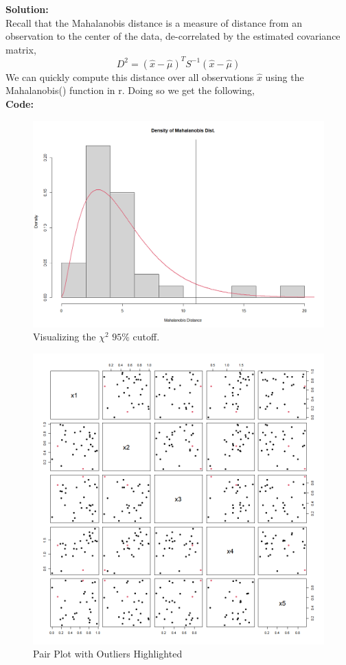 \documentclass[12pt]{article}
\makeatletter
\theoremstyle{homework}
\newenvironment{exercise}[1]
{\def\@currentlabel{#1}\exercisecore}
{\endexercisecore}
\newcommand{\localhead}[1]{\par\smallskip\noindent\textbf{#1}\nobreak\\}%
\newcommand\solution{\localhead{Solution:}}
\makeatother
\begin{document}
\begin{exercise}{1}
    \solution Recall that the Mahalanobis distance is a measure of distance from an observation to the 
    center of the data, de-correlated by the estimated covariance matrix, 
    \begin{equation*}
      D^2 = (\hat{x} - \hat{\mu})^{T}S^{-1}(\hat{x} - \hat{\mu})
    \end{equation*}
    We can quickly compute this distance over all observations $\hat{x}$ using the Mahalanobis() function in r. 
    Doing so we get the following, \\
    \textbf{Code:}
    \begin{center}
    
    \end{center}
    \begin{figure}[H]
      \begin{center}
        \caption{Visualizing the $\chi^2$ $95\%$ cutoff.}
      \includegraphics[width = \textwidth]{Rplot10.png}
      \end{center}
    \end{figure}
    \begin{figure}[H]
      \begin{center}
        \caption{Pair Plot with Outliers Highlighted}
      \includegraphics[width = .75\textwidth]{Rplot.png}
      \end{center}
    \end{figure}  
\end{exercise}
\end{document}
